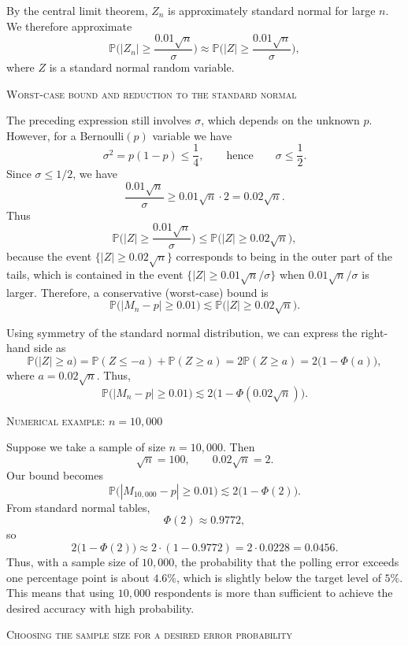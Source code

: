 By the central limit theorem, \(Z_n\) is approximately standard normal for large \(n\).  
We therefore approximate
\[
\mathbb{P}\Big(|Z_n| \geq \frac{0.01\sqrt{n}}{\sigma}\Big)
\approx
\mathbb{P}\Big(|Z| \geq \frac{0.01\sqrt{n}}{\sigma}\Big),
\]
where \(Z\) is a standard normal random variable.

\bigskip
\textsc{Worst-case bound and reduction to the standard normal}

The preceding expression still involves \(\sigma\), which depends on the unknown \(p\).  
However, for a Bernoulli\((p)\) variable we have
\[
\sigma^2 = p(1-p) \leq \frac{1}{4},
\qquad
\text{hence}
\qquad
\sigma \leq \frac{1}{2}.
\]
Since \(\sigma \leq 1/2\), we have
\[
\frac{0.01\sqrt{n}}{\sigma}
\geq
0.01\sqrt{n} \cdot 2
=
0.02\sqrt{n}.
\]
Thus
\[
\mathbb{P}\Big(|Z| \geq \frac{0.01\sqrt{n}}{\sigma}\Big)
\leq
\mathbb{P}\big(|Z| \geq 0.02\sqrt{n}\big),
\]
because the event \(\{|Z| \geq 0.02\sqrt{n}\}\) corresponds to being in the outer part of the tails, which is contained in the event \(\{|Z| \geq 0.01\sqrt{n}/\sigma\}\) when \(0.01\sqrt{n}/\sigma\) is larger.  
Therefore, a conservative (worst-case) bound is
\[
\mathbb{P}\big(|M_n - p| \geq 0.01\big)
\lesssim
\mathbb{P}\big(|Z| \geq 0.02\sqrt{n}\big).
\]

Using symmetry of the standard normal distribution, we can express the right-hand side as
\[
\mathbb{P}\big(|Z| \geq a\big)
=
\mathbb{P}(Z \leq -a) + \mathbb{P}(Z \geq a)
=
2\mathbb{P}(Z \geq a)
=
2\big(1 - \Phi(a)\big),
\]
where \(a = 0.02\sqrt{n}\).  
Thus,
\[
\mathbb{P}\big(|M_n - p| \geq 0.01\big)
\lesssim
2\big(1 - \Phi(0.02\sqrt{n})\big).
\]

\bigskip
\textsc{Numerical example: \(n = 10{,}000\)}

Suppose we take a sample of size \(n = 10{,}000\).  
Then
\[
\sqrt{n} = 100,
\qquad
0.02\sqrt{n} = 2.
\]
Our bound becomes
\[
\mathbb{P}\big(|M_{10{,}000} - p| \geq 0.01\big)
\lesssim
2\big(1 - \Phi(2)\big).
\]
From standard normal tables,
\[
\Phi(2) \approx 0.9772,
\]
so
\[
2\big(1 - \Phi(2)\big)
\approx
2\cdot (1 - 0.9772)
=
2\cdot 0.0228
=
0.0456.
\]
Thus, with a sample size of \(10{,}000\), the probability that the polling error exceeds one percentage point is about \(4.6\%\), which is slightly below the target level of \(5\%\).  
This means that using \(10{,}000\) respondents is more than sufficient to achieve the desired accuracy with high probability.

\bigskip
\textsc{Choosing the sample size for a desired error probability}

